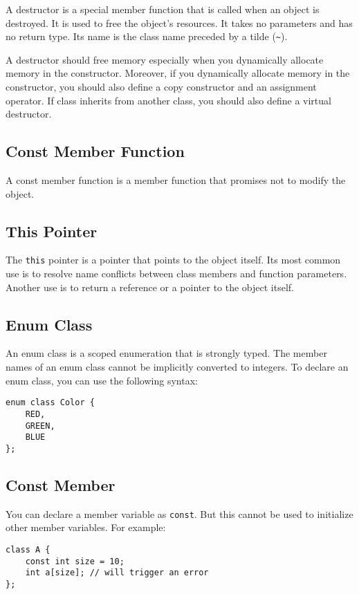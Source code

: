 \documentclass[a4paper,12pt]{article}
\begin{document}
A destructor is a special member function that is called when an object is destroyed.
It is used to free the object's resources.
It takes no parameters and has no return type.
Its name is the class name preceded by a tilde (\texttt{\~{}}).

A destructor should free memory especially when you dynamically allocate memory in the constructor.
Moreover, if you dynamically allocate memory in the constructor, you should also define a copy constructor and an assignment operator.
If class inherits from another class, you should also define a virtual destructor.

\subsection{Const Member Function}

A const member function is a member function that promises not to modify the object.

\subsection{This Pointer}

The \texttt{this} pointer is a pointer that points to the object itself.
Its most common use is to resolve name conflicts between class members and function parameters.
Another use is to return a reference or a pointer to the object itself.

\subsection{Enum Class}

An enum class is a scoped enumeration that is strongly typed.
The member names of an enum class cannot be implicitly converted to integers.
To declare an enum class, you can use the following syntax:
\begin{verbatim}
enum class Color {
    RED,
    GREEN,
    BLUE
};
\end{verbatim}

\subsection{Const Member}

You can declare a member variable as \texttt{const}.
But this cannot be used to initialize other member variables.
For example:
\begin{verbatim}
class A {
    const int size = 10; 
    int a[size]; // will trigger an error
};
\end{verbatim}
\end{document}
